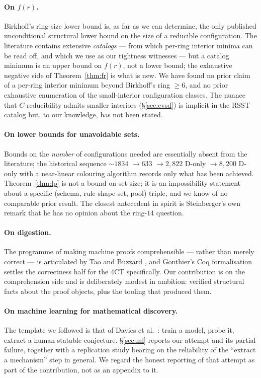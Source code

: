 \documentclass[11pt]{article}
\theoremstyle{definition}
\begin{document}
\paragraph{On $f(r)$.} Birkhoff's ring-size lower bound \cite{birkhoff1913} is, as far
as we can determine, the only published unconditional structural lower bound on the
size of a reducible configuration. The literature contains extensive
\emph{catalogs} --- from which per-ring interior minima can be read off, and which we
use as our tightness witnesses --- but a catalog minimum is an upper bound on $f(r)$,
not a lower bound; the exhaustive negative side of Theorem~\ref{thm:fr} is what is
new. We have found no prior claim of a per-ring interior minimum beyond
Birkhoff's ring $\ge6$, and no prior exhaustive enumeration of the small-interior
configuration classes. The nuance that $C$-reducibility admits smaller interiors
(\S\ref{sec:cvsd}) is implicit in the RSST catalog but, to our knowledge, has not
been stated.

\paragraph{On lower bounds for unavoidable sets.} Bounds on the \emph{number} of
configurations needed are essentially absent from the literature; the historical
sequence $\sim1834$ \cite{appel1977every2} $\to 633$ \cite{rsst1997} $\to 2{,}822$
D-only \cite{steinberger2010} $\to 8{,}200$ D-only with a near-linear colouring
algorithm \cite{nl4ct2026} records only what has been achieved. Theorem~\ref{thm:lp}
is not a bound on set size; it is an impossibility statement about a specific
(schema, rule-shape set, pool) triple, and we know of no comparable prior result.
The closest antecedent in spirit is Steinberger's own remark that he has no opinion
about the ring-$14$ question.

\paragraph{On digestion.} The programme of making machine proofs comprehensible ---
rather than merely correct --- is articulated by Tao \cite{tao2025machine} and
Buzzard \cite{buzzard2024}, and Gonthier's Coq formalisation \cite{gonthier2008}
settles the correctness half for the 4CT specifically. Our contribution is on the
comprehension side and is deliberately modest in ambition: verified structural facts
about the proof objects, plus the tooling that produced them.

\paragraph{On machine learning for mathematical discovery.} The template we followed
is that of Davies et al.\ \cite{davies2021,davies2021signature}: train a model, probe
it, extract a human-statable conjecture. \S\ref{sec:ml} reports our attempt and its
partial failure, together with a replication study bearing on the reliability of the
``extract a mechanism'' step in general. We regard the honest reporting of that
attempt as part of the contribution, not as an appendix to it.
\end{document}
